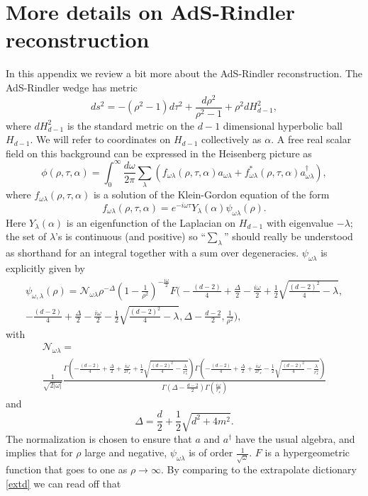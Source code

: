 \documentclass[11pt]{article}
\newcommand{\be}{\begin{equation}}
\newcommand{\ee}{\end{equation}}
\begin{document}
\appendix
\section{More details on AdS-Rindler reconstruction}\label{rindapp}
In this appendix we review a bit more about the AdS-Rindler reconstruction.  The AdS-Rindler wedge has metric
\be
ds^2=-(\rho^2-1)d\tau^2+\frac{d\rho^2}{\rho^2-1}+\rho^2 d H_{d-1}^2,
\ee 
where $d H_{d-1}^2$ is the standard metric on the $d-1$ dimensional hyperbolic ball $H_{d-1}$.  We will refer to coordinates on $H_{d-1}$ collectively as $\alpha$.  A free real scalar field on this background can be expressed in the Heisenberg picture as
\be\label{phieq}
\phi(\rho,\tau,\alpha)=\int_0^\infty\frac{d\omega}{2\pi}\sum_\lambda\left(f_{\omega \lambda}(\rho,\tau,\alpha) a_{\omega\lambda}+f_{\omega \lambda}^*(\rho,\tau,\alpha) a_{\omega\lambda}^\dagger\right),
\ee
where $f_{\omega \lambda}(\rho,\tau,\alpha)$ is a solution of the Klein-Gordon equation of the form
\be
f_{\omega \lambda}(\rho,\tau,\alpha)=e^{-i\omega \tau} Y_\lambda(\alpha) \psi_{\omega\lambda}(\rho).
\ee
Here $Y_\lambda(\alpha)$ is an eigenfunction of the Laplacian on $H_{d-1}$ with eigenvalue $-\lambda$; the set of $\lambda$'s is continuous (and positive) so ``$\sum_\lambda$'' should really be understood as shorthand for an integral together with a sum over degeneracies.  $\psi_{\omega \lambda}$ is explicitly given by
\begin{multline}
\psi_{\omega,\lambda}(\rho)=\mathcal{N}_{\omega\lambda}\rho^{-\Delta}\left(1-\frac{1}{\rho^2}\right)^{-\frac{i\omega}{2}}F\Bigg(-\frac{(d-2)}{4}+\frac{\Delta}{2}-\frac{i\omega}{2}+\frac{1}{2}\sqrt{\frac{(d-2)^2}{4}-\lambda},\\
-\frac{(d-2)}{4}+\frac{\Delta}{2}-\frac{i\omega}{2}-\frac{1}{2}\sqrt{\frac{(d-2)^2}{4}-\lambda},\Delta-\frac{d-2}{2},\frac{1}{\rho^2}\Bigg),
\end{multline}
with 
\begin{multline}
\mathcal{N}_{\omega \lambda}= \\ \frac{1}{\sqrt{2|\omega|}}\frac{\Gamma\left(-\frac{(d-2)}{4}+\frac{\Delta}{2}+\frac{i\omega}{2r_s}+\frac{1}{2}\sqrt{\frac{(d-2)^2}{4}-\frac{\lambda}{r_s^2}}\right)\Gamma\left(-\frac{(d-2)}{4}+\frac{\Delta}{2}+\frac{i\omega}{2r_s}-\frac{1}{2}\sqrt{\frac{(d-2)^2}{4}-\frac{\lambda}{r_s^2}}\right)}{\Gamma\left(\Delta-\frac{d-2}{2}\right)\Gamma\left(\frac{i\omega}{r_s}\right)}
\end{multline}
and
\be
\Delta=\frac{d}{2}+\frac{1}{2}\sqrt{d^2+4m^2}.
\ee
The normalization is chosen to ensure that $a$ and $a^\dagger$ have the usual algebra, and implies that for $\rho$ large and negative, $\psi_{\omega \lambda}$ is of order $\frac{1}{\sqrt{\omega}}$.  $F$ is a hypergeometric function that goes to one as $\rho \to \infty$.  By comparing to the extrapolate dictionary \eqref{extd} we can read off that 
\end{document}
